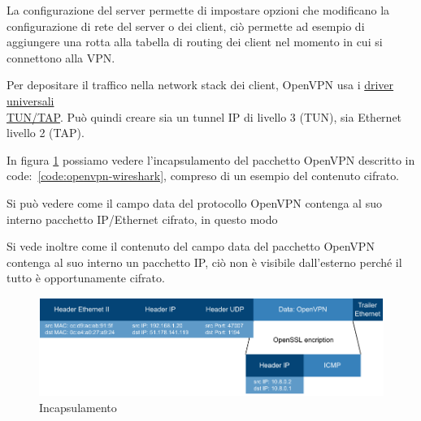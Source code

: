 La configurazione del server permette di impostare opzioni che modificano la configurazione di rete del server o dei client, ciò permette ad esempio di aggiungere una rotta alla tabella di routing dei client nel momento in cui si connettono alla VPN.


Per depositare il traffico nella network stack dei client, OpenVPN usa i \href{https://docs.kernel.org/networking/tuntap.html}{driver universali \\TUN/TAP}. Può quindi creare sia un tunnel IP di livello 3 (TUN), sia Ethernet livello 2 (TAP).

\todo[da rivedere!]

In figura \ref{fig:incapsulamento-openvpn} possiamo vedere l'incapsulamento del pacchetto OpenVPN descritto in code:~\ref{code:openvpn-wireshark}, compreso di un esempio del contenuto cifrato. 

Si può vedere come il campo data del protocollo OpenVPN contenga al suo interno pacchetto IP/Ethernet cifrato, in questo modo 

Si vede inoltre come il contenuto del campo data del pacchetto OpenVPN contenga al suo interno un pacchetto IP, ciò non è visibile dall'esterno perché il tutto è opportunamente cifrato.

\begin{figure}[h]
    \centering
    \includegraphics[width=1\textwidth]{immagini/diag2-incapsulamento_openvpn}
    \caption{Incapsulamento}
    \label{fig:incapsulamento-openvpn}
\end{figure}

